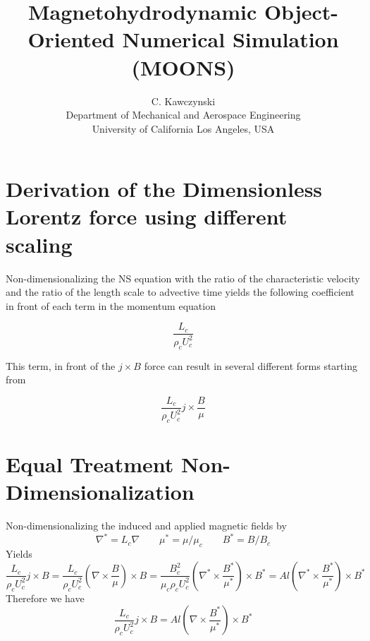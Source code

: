 \documentclass[11pt]{article}
\begin{document}
\doublespacing
\title{Magnetohydrodynamic Object-Oriented Numerical Simulation (MOONS)}
\author{C. Kawczynski \\
Department of Mechanical and Aerospace Engineering \\
University of California Los Angeles, USA\\
}
\maketitle

\section{Derivation of the Dimensionless Lorentz force using different scaling}
Non-dimensionalizing the NS equation with the ratio of the characteristic velocity and the ratio of the length scale to advective time yields the following coefficient in front of each term in the momentum equation

\begin{equation}
	\frac{L_c}{\rho_c U_c^2}
\end{equation}

This term, in front of the $j\times B$ force can result in several different forms starting from

\begin{equation}
	 \frac{L_c}{\rho_c U_c^2} j \times \frac{B}{\mu}
\end{equation}

\section{Equal Treatment Non-Dimensionalization}
Non-dimensionalizing the induced and applied magnetic fields by
\begin{equation}
	\nabla^* = L_c \nabla \qquad
	\mu^* = \mu / \mu_c \qquad
	B^* = B/B_c
\end{equation}
Yields
\begin{equation}
	 \frac{L_c}{\rho_c U_c^2} j \times B
	 =
	 \frac{L_c}{\rho_c U_c^2} \left( \nabla \times \frac{B}{\mu} \right) \times B
	 =
	\frac{B_c^2}{\mu_c \rho_c U_c^2} \left( \nabla^* \times \frac{B^*}{\mu^*} \right) \times B^*
	 =
	Al \left( \nabla^* \times \frac{B^*}{\mu^*} \right) \times B^*
\end{equation}
Therefore we have
\begin{equation}
	\boxed{
	 \frac{L_c}{\rho_c U_c^2} j \times B
	 =
	Al \left( \nabla \times \frac{B^*}{\mu^*} \right) \times B^*
	}
\end{equation}
\end{document}
